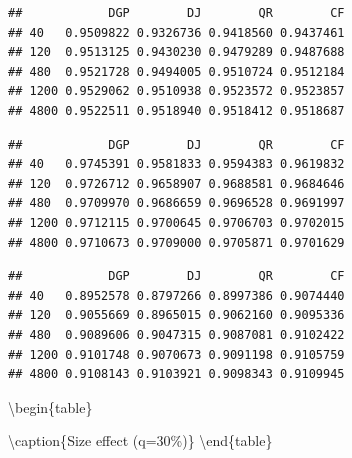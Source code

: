 \documentclass[
]{article}
\begin{document}
\begin{verbatim}
##            DGP        DJ        QR        CF
## 40   0.9509822 0.9326736 0.9418560 0.9437461
## 120  0.9513125 0.9430230 0.9479289 0.9487688
## 480  0.9521728 0.9494005 0.9510724 0.9512184
## 1200 0.9529062 0.9510938 0.9523572 0.9523857
## 4800 0.9522511 0.9518940 0.9518412 0.9518687
\end{verbatim}

\begin{verbatim}
##            DGP        DJ        QR        CF
## 40   0.9745391 0.9581833 0.9594383 0.9619832
## 120  0.9726712 0.9658907 0.9688581 0.9684646
## 480  0.9709970 0.9686659 0.9696528 0.9691997
## 1200 0.9712115 0.9700645 0.9706703 0.9702015
## 4800 0.9710673 0.9709000 0.9705871 0.9701629
\end{verbatim}

\begin{verbatim}
##            DGP        DJ        QR        CF
## 40   0.8952578 0.8797266 0.8997386 0.9074440
## 120  0.9055669 0.8965015 0.9062160 0.9095336
## 480  0.9089606 0.9047315 0.9087081 0.9102422
## 1200 0.9101748 0.9070673 0.9091198 0.9105759
## 4800 0.9108143 0.9103921 0.9098343 0.9109945
\end{verbatim}

\textbackslash begin\{table\}

\textbackslash caption\{\label{tab:size0.3}Size effect (q=30\%)\}
\centering {} \textbackslash end\{table\}
\end{document}
